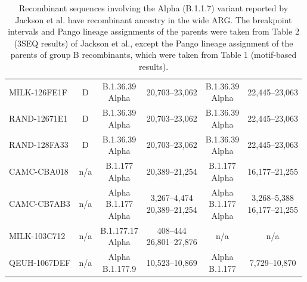 \documentclass{article}
\begin{document}
\begin{table}
\begin{tabular}{l|c|c|c|c|c}
MILK-126FE1F & D & \thead{B.1.36.39 \\ Alpha} & 20,703–23,062 & \thead{B.1.36.39 \\ Alpha} & 22,445–23,063 \\
RAND-12671E1 & D & \thead{B.1.36.39 \\ Alpha} & 20,703–23,062 & \thead{B.1.36.39 \\ Alpha} & 22,445–23,063 \\
RAND-128FA33 & D & \thead{B.1.36.39 \\ Alpha} & 20,703–23,062 & \thead{B.1.36.39 \\ Alpha} & 22,445–23,063 \\
CAMC-CBA018 & n/a & \thead{B.1.177 \\ Alpha} & 20,389–21,254 & \thead{B.1.177 \\ Alpha} & 16,177–21,255 \\
CAMC-CB7AB3 & n/a & \thead{Alpha \\ B.1.177 \\ Alpha} & \thead{3,267–4,474 \\ 20,389–21,254} & \thead{Alpha \\ B.1.177 \\ Alpha} & \thead{3,268–5,388 \\ 16,177–21,255} \\
MILK-103C712 & n/a & \thead{B.1.177.17 \\ Alpha} & \thead{408–444 \\ 26,801–27,876} & n/a & n/a \\
QEUH-1067DEF & n/a & \thead{Alpha \\ B.1.177.9} & 10,523–10,869 & \thead{Alpha \\ B.1.177} & 7,729–10,870 \\
\hline
\end{tabular}
\caption{\label{tab:jackson}Recombinant sequences involving the Alpha (B.1.1.7) variant reported by Jackson et al. \cite{Jackson2021-ik} have recombinant ancestry in the wide ARG. The breakpoint intervals and Pango lineage assignments of the parents were taken from Table 2 (3SEQ results) of Jackson et al., except the Pango lineage assignment of the parents of group B recombinants, which were taken from Table 1 (motif-based results).}
\end{table}
\end{document}
